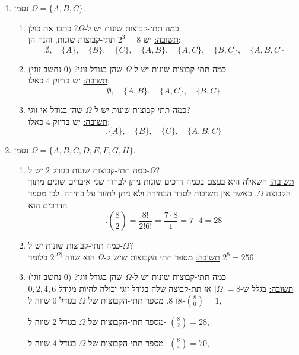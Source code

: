 \documentclass[12pt, a4paper]{article}
\begin{document}
\begin{enumerate}
\begin{enumerate}
\item
נסמן
$\Omega=\{A,B,C\}$.
\begin{enumerate}
\item[(1)]
כמה תתי-קבוצות שונות 
יש ל-$\Omega$?
כתבו את כולן.
\\

\underline{תשובה:}
יש 
$\boxed{2^3=8}$
תתי-קבוצות שונות, והנה הן:
$$.\boxed{\emptyset,\quad
\{A\},\quad
\{B\},\quad
\{C\},\quad
\{A,B\},\quad
\{A,C\},\quad
\{B,C\},\quad
\{A,B,C\}}$$
\item[(2)]
כמה תתי-קבוצות שונות יש ל-$\Omega$
שהן בגודל זוגי? ($0$
נחשב זוגי)
\\

\underline{תשובה:}
יש בדיוק 
$\boxed{4}$
כאלו:
$$\emptyset, \quad
 \{A,B\}, \quad
\{A,C\}, \quad
\{B,C\}$$
\item[(3)]
כמה תתי-קבוצות שונות יש ל-$\Omega$
שהן בגודל אי-זוגי?
\\

\underline{תשובה:}
יש בדיוק 
$\boxed{4}$
כאלו:
$$.\{A\},\quad
\{B\},\quad
\{C\},\quad
\{A,B,C\}$$
\end{enumerate}

\item
נסמן
$\Omega=\{A,B,C,D,E,F,G,H\}$.
\begin{enumerate}
\item[(1)]
כמה תתי-קבוצות שונות בגודל
$2$
יש ל-$\Omega$?
\\

\underline{תשובה:}
השאלה היא בעצם בכמה דרכים שונות ניתן לבחור שני איברים שונים מתוך הקבוצה
$\Omega$,
כאשר אין חשיבות לסדר הבחירה ולא ניתן לחזור על בחירה, לכן מספר הדרכים הוא
$$.\boxed{\binom{8}{2}=\frac{8!}{2!6!}=\frac{7\cdot 8}{1}=7\cdot 4=28}$$
\item[(2)]
כמה תתי-קבוצות שונות יש ל-$\Omega$?
\\

\underline{תשובה:}
 מספר תתי הקבוצות שיש ל-$\Omega$
הוא שווה
$2^{|\Omega|}$
כלומר
$\boxed{2^8=256}$.\\
\item[(3)]
כמה תתי-קבוצות שונות יש ל-$\Omega$
שהן בגודל זוגי? ($0$
נחשב זוגי)
\\

\underline{תשובה:}
בגלל ש-$|\Omega|=8$
אז תת-קבוצה שלה בגודל זוגי יכולה להיות מגודל
$0,2,4,6$
או
$8$.
מספר תתי-הקבוצות של
$\Omega$
בגודל 
$0$
שווה ל-$\binom{8}{0}=1$,

מספר תתי-הקבוצות של
$\Omega$
בגודל 
$2$
שווה ל-
$\binom{8}{2}=28$,

מספר תתי-הקבוצות של
$\Omega$
בגודל 
$4$
שווה ל-
$\binom{8}{4}=70$,


\end{enumerate}
\end{enumerate}
\end{enumerate}
\end{document}
